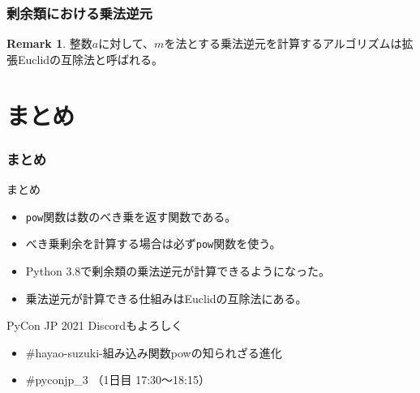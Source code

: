 \documentclass[aspectratio=169,dvipdfmx,14pt,notheorems]{beamer}
\theoremstyle{definition}
\newtheorem*{remark}{Remark}
\begin{document}
\begin{frame}[fragile]\frametitle{剰余類における乗法逆元}
\begin{remark}
整数$a$に対して、$m$を法とする乗法逆元を計算するアルゴリズムは拡張Euclidの互除法と呼ばれる。
\end{remark}
\end{frame}


\section{まとめ}

\begin{frame}[fragile]\frametitle{まとめ}
\begin{block}{まとめ}
\begin{itemize}
\item \texttt{pow}関数は数のべき乗を返す関数である。
\item べき乗剰余を計算する場合は必ず\texttt{pow}関数を使う。
\item Python 3.8で剰余類の乗法逆元が計算できるようになった。
\item 乗法逆元が計算できる仕組みはEuclidの互除法にある。
\end{itemize}
\end{block}

\begin{block}{PyCon JP 2021 Discordもよろしく}
\begin{itemize}
\item \#hayao-suzuki-組み込み関数powの知られざる進化
\item \#pyconjp\_3 （1日目 17:30～18:15）
\end{itemize}
\end{block}
\end{frame}
\end{document}

